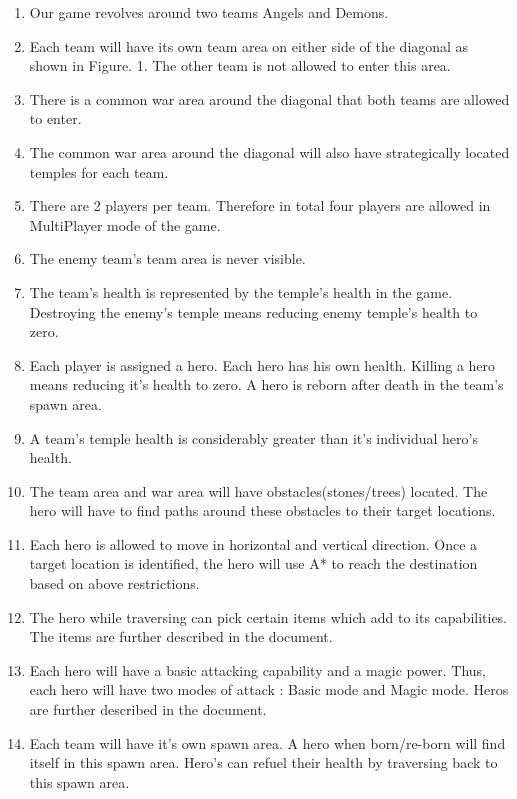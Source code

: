 \documentclass[a4paper]{article}
\begin{document}
\begin{enumerate}
\item Our game revolves around two teams Angels and Demons.

\item Each team will have its own team area on either side of the diagonal as shown in Figure. 1. The other team is not allowed to enter this area.

\item There is a common war area around the diagonal that both teams are allowed to enter.

\item The common war area around the diagonal will also have strategically located temples for each team.

\item There are 2 players per team. Therefore in total four players are allowed in MultiPlayer mode of the game.

\item The enemy team's team area is never visible.

\item The team's health is represented by the temple's health in the game. Destroying the enemy's temple means reducing enemy temple's health to zero.

\item Each player is assigned a hero. Each hero has his own health. Killing a hero means reducing it's health to zero. A hero is reborn after death in the team’s spawn area.

\item A team's temple health is considerably greater than it's individual hero's health.

\item The team area and war area will have obstacles(stones/trees) located. The hero will have to find paths around these obstacles to their target locations.

\item Each hero is allowed to move in horizontal and vertical direction. Once a target location is identified, the hero will use A* to reach the destination based on above restrictions.

\item The hero while traversing can pick certain items which add to its capabilities. The items are further described in the document.

\item Each hero will have a basic attacking capability and a magic power. Thus, each hero will have two modes of attack : Basic mode and Magic mode. Heros are further described in the document.

\item Each team will have it's own spawn area. A hero when born/re-born will find itself in this spawn area. Hero's can refuel their health by traversing back to this spawn area.
\end{enumerate}
\end{document}
